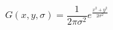 \begin{equation}
G(x,y,\sigma) = \frac{1}{2 \pi \sigma ^2} e ^ {\frac{x^2 +y^2}{2 \sigma^2}}
\end{equation}
